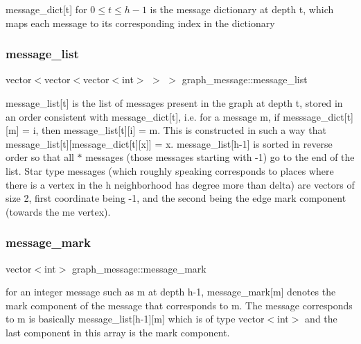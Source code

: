 message\+\_\+dict\mbox{[}t\mbox{]} for $0 \leq t \leq h-1$ is the message dictionary at depth t, which maps each message to its corresponding index in the dictionary 

\mbox{\label{classgraph__message_aa17fdb629b423343edfafa97252763ef}} 
\subsubsection{\texorpdfstring{message\+\_\+list}{message\_list}}
{\footnotesize\ttfamily vector$<$vector$<$vector$<$int$>$ $>$ $>$ graph\+\_\+message\+::message\+\_\+list}



message\+\_\+list\mbox{[}t\mbox{]} is the list of messages present in the graph at depth t, stored in an order consistent with message\+\_\+dict\mbox{[}t\mbox{]}, i.\+e. for a message m, if messsage\+\_\+dict\mbox{[}t\mbox{]}\mbox{[}m\mbox{]} = i, then message\+\_\+list\mbox{[}t\mbox{]}\mbox{[}i\mbox{]} = m. This is constructed in such a way that message\+\_\+list\mbox{[}t\mbox{]}\mbox{[}message\+\_\+dict\mbox{[}t\mbox{]}\mbox{[}x\mbox{]}\mbox{]} = x. message\+\_\+list\mbox{[}h-\/1\mbox{]} is sorted in reverse order so that all $\ast$ messages (those messages starting with -\/1) go to the end of the list. Star type messages (which roughly speaking corresponds to places where there is a vertex in the h neighborhood has degree more than delta) are vectors of size 2, first coordinate being -\/1, and the second being the edge mark component (towards the \textquotesingle{}me\textquotesingle{} vertex). 

\mbox{\label{classgraph__message_a49d9af5150daf0599c29fe18cb032fa5}} 
\subsubsection{\texorpdfstring{message\+\_\+mark}{message\_mark}}
{\footnotesize\ttfamily vector$<$int$>$ graph\+\_\+message\+::message\+\_\+mark}



for an integer message such as m at depth h-\/1, message\+\_\+mark\mbox{[}m\mbox{]} denotes the mark component of the message that corresponds to m. The message corresponds to m is basically message\+\_\+list\mbox{[}h-\/1\mbox{]}\mbox{[}m\mbox{]} which is of type vector$<$int$>$ and the last component in this array is the mark component. 

